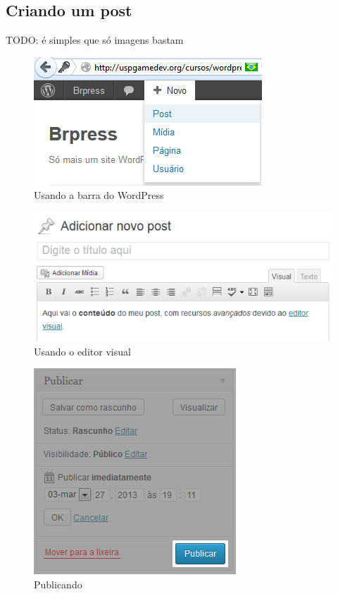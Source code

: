 \documentclass[12pt,onecolumn]{article}
\begin{document}
	\subsection{Criando um post}
		TODO: é simples que só imagens bastam
		\begin{figure}[H]
			\centering
			\includegraphics{post1.png}
			\caption{Usando a barra do WordPress}
		\end{figure}
		\begin{figure}[H]
			\centering
			\includegraphics{post2.png}
			\caption{Usando o editor visual}
		\end{figure}
		\begin{figure}[H]
			\centering
			\includegraphics{post3.png}
			\caption{Publicando}
		\end{figure}
\end{document}
